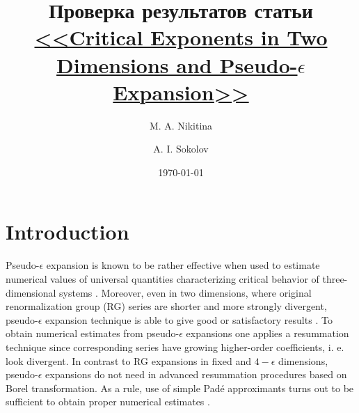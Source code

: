 \documentclass[aps,prb,preprint,showpacs,preprintnumbers,amsmath,amssymb]{revtex4}
\newcommand{\comment}[1]{} %
\begin{document}
\title{Проверка результатов статьи \\ 
\href{http://arxiv.org/abs/1312.1062}{<<Critical Exponents in Two Dimensions and Pseudo-$\epsilon$ Expansion>>}}
\author{M. A. Nikitina}
\author{A. I. Sokolov}
\date{\today}

\comment{
\begin{abstract}
The critical behavior of two-dimensional $n$-vector $\lambda\phi^4$ field model
is studied within the framework of pseudo-$\epsilon$ expansion approach.
Pseudo-$\epsilon$ expansions for Wilson fixed point location $g^*$ and critical
exponents originating from five-loop 2D renormalization group series are derived.
Numerical estimates obtained within Pad\'e and Pad\'e-Borel resummation procedures
as well as by direct summation are presented for $n = 1$, $n = 0$ and $n = -1$,
i. e. for physically interesting models which are exactly solvable.
The pseudo-$\epsilon$ expansions for $g^*$, critical exponents $\gamma$ and $\nu$
have small lower-order coefficients and slow increasing higher-order ones. As a
result, direct summation of these series with optimal cut off provides numerical
estimates that are no worse than those given by the resummation approaches
mentioned. This enables one to consider the pseudo-$\epsilon$ expansion technique
itself as some specific resummation method.
\end{abstract}

\pacs{05.10.Cc, 05.70.Jk, 64.60.ae, 64.60.Fr}
}
\maketitle

\section{Introduction}

Pseudo-$\epsilon$ expansion is known to be rather effective when used to
estimate numerical values of universal quantities characterizing critical
behavior of three-dimensional systems \cite{GZJ1980, GZJ1998, FHY2000, HID2004}.
Moreover, even in two dimensions, where original renormalization group (RG)
series are shorter and more strongly divergent, pseudo-$\epsilon$ expansion
technique is able to give good or satisfactory results \cite{GZJ1980, COPS2004,
S2005}. To obtain numerical estimates from pseudo-$\epsilon$ expansions one
applies a resummation technique since corresponding series have growing
higher-order coefficients, i. e. look divergent. In contrast to RG expansions in
fixed and $4-\epsilon$ dimensions, pseudo-$\epsilon$ expansions do not need in
advanced resummation procedures based on Borel transformation. As a rule, use of
simple Pad\'e approximants turns out to be sufficient to obtain proper numerical
estimates \cite{FHY2000, COPS2004, S2005}.
\end{document}

